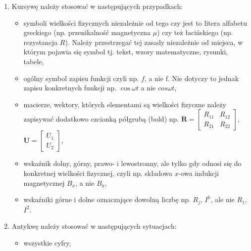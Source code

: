 \documentclass[12pt,twoside]{article}
\begin{document}
\begin{enumerate}[label=\arabic*), leftmargin=1.25cm]
	\item Kursywę należy stosować w następujących przypadkach:

	      \begin{itemize}[label=-,labelsep=0.4cm,leftmargin=0.6cm] %
		      \item symboli wielkości fizycznych niezależnie od tego czy jest to litera alfabetu greckiego (np. przenikalność magnetyczna $\mu$) czy też łacińskiego (np. rezystancja $R$). Należy przestrzegać tej zasady niezależnie od miejsca, w którym pojawia się symbol tj. tekst, wzory matematyczne, rysunki, tabele,

		      \item ogólny symbol zapisu funkcji czyli np. $f$, a nie f. Nie dotyczy to jednak zapisu konkretnych funkcji np. $\cos \omega t$ a nie $cos \omega t$,

		      \item macierze, wektory, których elementami są wielkości fizyczne należy zapisywać dodatkowo czcionką półgrubą (bold) np.
		            $\bm{R} = \left[
				            \begin{array}{cc}
					            R_{11} & R_{12} \\
					            R_{21} & R_{22}
				            \end{array}
				            \right]$,
		            $\bm{U} = \left[
				            \begin{array}{c}
					            U_{1} \\
					            U_{2}
				            \end{array}
				            \right]$,

		      \item wskaźnik dolny, górny, prawo- i lewostronny, ale tylko gdy odnosi się do konkretnej wielkości fizycznej, czyli np. składowa $x$-owa indukcji magnetycznej $B_x$, a nie $B_{\mathrm{x}}$,

		      \item wskaźniki górne i dolne oznaczające dowolną liczbę np. $R_j$, $I^k$, ale nie $R_\mathit{1}$, $I^\mathit{2}$.

	      \end{itemize}

	\item Antykwę należy stosować w następujących sytuacjach:

	      \begin{itemize}[label=-,labelsep=0.4cm,leftmargin=0.6cm]
		      \item wszystkie cyfry,


\end{itemize}
\end{enumerate}
\end{document}
